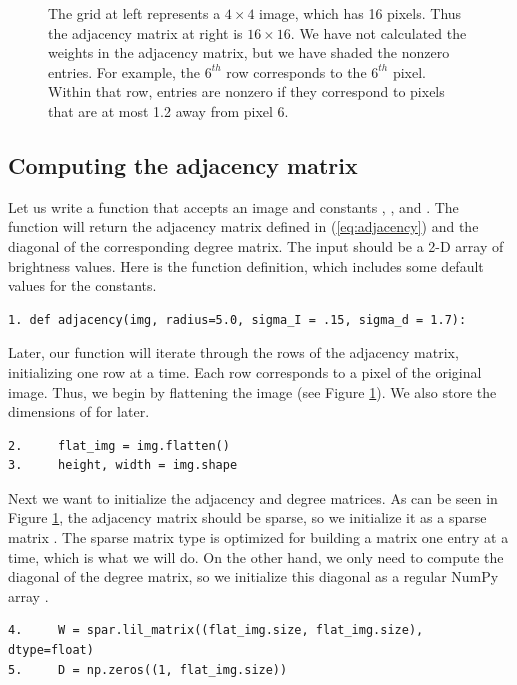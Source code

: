 \begin{figure}

\caption{The grid at left represents a $4\times4$ image, which has 16 pixels. Thus the adjacency matrix at right is $16 \times 16$. We have not calculated the weights in the adjacency matrix, but we have shaded the nonzero entries. For example, the $6^{th}$ row corresponds to the $6^{th}$ pixel. Within that row, entries are nonzero if they correspond to pixels that are at most 1.2 away from pixel 6.}
\label{fig:adjacency}
\end{figure}


\subsection*{Computing the adjacency matrix}
Let us write a function that accepts an image  and constants , , and . The function will return the adjacency matrix defined in (\ref{eq:adjacency}) and the diagonal of the corresponding degree matrix. The input  should be a 2-D array of brightness values. Here is the function definition, which includes some default values for the constants.
\begin{lstlisting}
1. def adjacency(img, radius=5.0, sigma_I = .15, sigma_d = 1.7):
\end{lstlisting}

Later, our function will iterate through the rows of the adjacency matrix, initializing one row at a time. Each row corresponds to a pixel of the original image. Thus, we begin by flattening the image (see Figure \ref{fig:adjacency}). We also store the dimensions of  for later.
\begin{lstlisting}
2.     flat_img = img.flatten()
3.     height, width = img.shape
\end{lstlisting}

Next we want to initialize the adjacency and degree matrices. As can be seen in Figure \ref{fig:adjacency}, the adjacency matrix should be sparse, so we initialize it as a sparse matrix . The sparse matrix type  is optimized for building a matrix one entry at a time, which is what we will do. On the other hand, we only need to compute the diagonal of the degree matrix, so we initialize this diagonal as a regular NumPy array .
\begin{lstlisting}
4.     W = spar.lil_matrix((flat_img.size, flat_img.size), dtype=float)
5.     D = np.zeros((1, flat_img.size))
\end{lstlisting}

